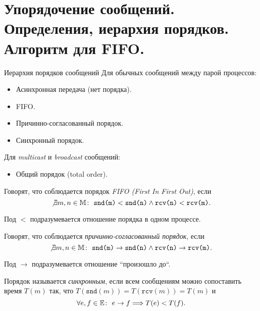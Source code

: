 \section{Упорядочение сообщений. Определения, иерархия порядков. Алгоритм для FIFO.}

\begin{definition} Иерархия порядков сообщений
    Для обычных сообщений между парой процессов:
    \begin{itemize}
        \item Асинхронная передача (нет порядка).
        \item FIFO.
        \item Причинно-согласованный порядок.
        \item Синхронный порядок.
    \end{itemize}

    Для \textit{multicast} и \textit{broadcast} сообщений:
    \begin{itemize}
        \item Общий порядок (total order).
    \end{itemize}
\end{definition}

\begin{definition}
    Говорят, что соблюдается порядок \textit{FIFO (First In First Out)}, если
    \[
        \not \exists m,n \in \mathbb{M} \colon~ \texttt{snd(m)} < \texttt{snd(n)}
        \wedge \texttt{rcv(n)} < \texttt{rcv(m)}
    .\]
\end{definition}

\begin{remark}
    Под $<$ подразумевается отношение порядка в одном процессе.
\end{remark}

\begin{definition}
    Говорят, что соблюдается \textit{причинно-согласованный порядок}, если
    \[
        \not \exists m,n \in \mathbb{M} \colon~ \texttt{snd(m)} \rightarrow \texttt{snd(n)}
        \wedge \texttt{rcv(n)} \rightarrow \texttt{rcv(m)}
    .\]
\end{definition}

\begin{remark}
    Под $\to$ подразумевается отношение ``произошло до``.
\end{remark}

\begin{definition}
    Порядок называется \textit{синхронным}, если всем сообщениям можно сопоставить время $T(m)$ так, что $T(\texttt{snd}(m)) = T(\texttt{rcv}(m)) = T(m)$ и
    \[
        \forall e,f \in \mathbb{E} \colon~ e \rightarrow f
        \Longrightarrow T(e) < T(f)
    .\]
\end{definition}

